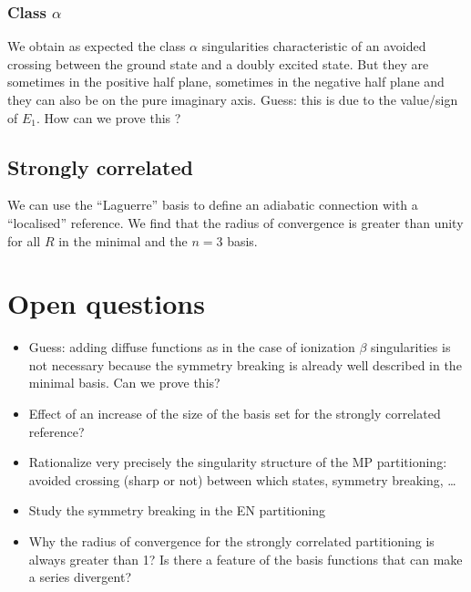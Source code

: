 \documentclass{article}
\begin{document}
\subsubsection{Class $\alpha$}

We obtain as expected the class $\alpha$ singularities characteristic of an avoided crossing between the ground state and a doubly excited state. 
But they are sometimes in the positive half plane, sometimes in the negative half plane and they can also be on the pure imaginary axis.
Guess: this is due to the value/sign of $E_1$. 
How can we prove this ?

\subsection{Strongly correlated}

We can use the ``Laguerre'' basis to define an adiabatic connection with a ``localised'' reference. 
We find that the radius of convergence is greater than unity for all $R$ in the minimal and the $n = 3$ basis. 

\section{Open questions}

\begin{itemize}
	\item Guess: adding diffuse functions as in the case of ionization $\beta$ singularities is not necessary because the symmetry breaking is already well described in the minimal basis. 
	Can we prove this?
	\item Effect of an increase of the size of the basis set for the strongly correlated reference?
	\item Rationalize very precisely the singularity structure of the MP partitioning: avoided crossing (sharp or not) between which states, symmetry breaking, \ldots
	\item Study the symmetry breaking in the EN partitioning
	\item Why the radius of convergence for the strongly correlated partitioning is always greater than 1? 
	Is there a feature of the basis functions that can make a series divergent?
\end{itemize}
\end{document}
